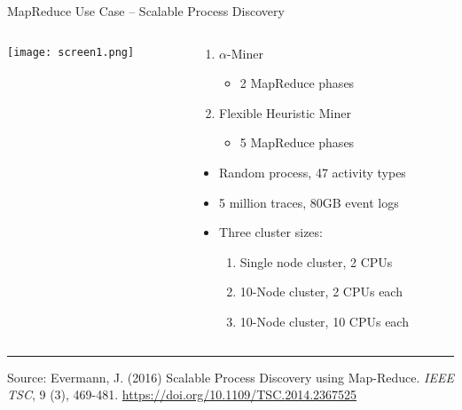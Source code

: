 \documentclass[ignorenonframetext,xcolor=x11names]{beamer}
\begin{document}
\begin{frame}{MapReduce Use Case -- Scalable Process Discovery}
\begin{columns}
\begin{column}{.3\textwidth}
\texttt{[image: screen1.png]}
\end{column}
\begin{column}{.7\textwidth}
\begin{enumerate}
 \item $\alpha$-Miner
 \begin{itemize}
    \item 2 MapReduce phases
 \end{itemize}
 \item Flexible Heuristic Miner
 \begin{itemize}
    \item 5 MapReduce phases
 \end{itemize}
\end{enumerate}
\begin{itemize}
  \item Random process, 47 activity types
  \item 5 million traces, 80GB event logs
  \item Three cluster sizes:
  \begin{enumerate}
     \item Single node cluster, 2 CPUs
     \item 10-Node cluster, 2 CPUs each
     \item 10-Node cluster, 10 CPUs each
  \end{enumerate}
\end{itemize}
\end{column}
\end{columns}

\vspace{\baselineskip}
\hrule

\small 
\vspace{\baselineskip}
Source: Evermann, J. (2016) Scalable Process Discovery using Map-Reduce. \emph{IEEE TSC}, 9 (3), 469-481. \footnotesize \url{https://doi.org/10.1109/TSC.2014.2367525}
\end{frame}
\end{document}

